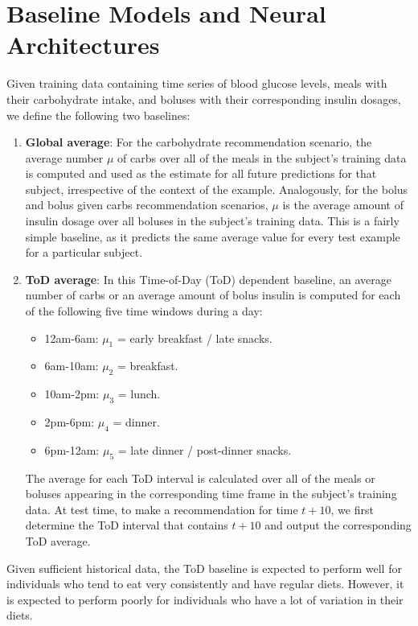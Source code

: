 \documentclass[graybox]{svmult}
\begin{document}

\section{Baseline Models and Neural Architectures}
\label{sec:models}

Given training data containing time series of blood glucose levels, meals with their carbohydrate intake, and boluses with their corresponding insulin dosages, we define the following two baselines:
\begin{enumerate}
    \item {\bf Global average}: 
    For the carbohydrate recommendation scenario, the average number $\mu$ of carbs over all of the meals in the subject's training data is computed and used as the estimate for all future predictions for that subject, irrespective of the context of the example. Analogously, for the bolus and bolus given carbs recommendation scenarios, $\mu$ is the average amount of insulin dosage over all boluses in the subject's training data. This is a fairly simple baseline, as it predicts the same average value for every test example for a particular subject.
    
    \item {\bf ToD average}: In this Time-of-Day (ToD) dependent baseline, an average number of carbs or an average amount of bolus insulin is computed for each of the following five time windows during a day:
	\begin{itemize}
		\item 12am-6am: $\mu_1$ = early breakfast / late snacks.
		\item 6am-10am: $\mu_2$ = breakfast.
		\item 10am-2pm: $\mu_3$ = lunch.
		\item 2pm-6pm: $\mu_4$ = dinner.
		\item 6pm-12am: $\mu_5$ = late dinner / post-dinner snacks.
	\end{itemize}
    The average for each ToD interval is calculated over all of the meals or boluses appearing in the corresponding time frame in the subject's training data. At test time, to make a recommendation for time $t+10$, we first determine the ToD interval that contains $t+10$ and output the corresponding ToD average.
\end{enumerate}
Given sufficient historical data, the ToD baseline is expected to perform well for individuals who tend to eat very consistently and have regular diets. However, it is expected to perform poorly for individuals who have a lot of variation in their diets.
\end{document}
